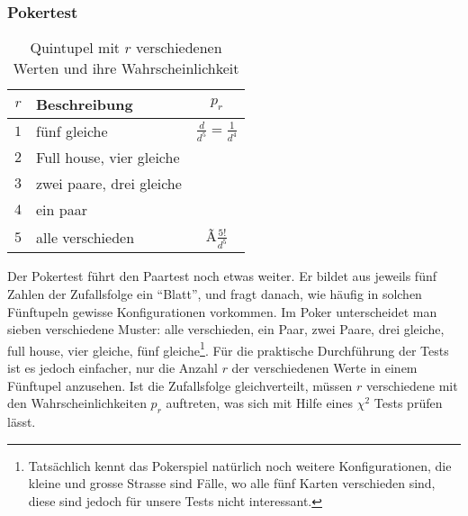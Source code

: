 \subsubsection{Pokertest}
\begin{table}
\begin{center}
\begin{tabular}{|c|l|c|}
\hline
$r$&Beschreibung&$p_r$\\
\hline
$1$&fünf gleiche&$\frac{d}{d^5}=\frac1{d^4}$\\
$2$&Full house, vier gleiche&$ $\\
$3$&zwei paare, drei gleiche&$ $\\
$4$&ein paar&$ $\\
$5$&alle verschieden&Ã$\frac{5!}{d^5}$\\
\hline
\end{tabular}
\end{center}
\caption{Quintupel mit $r$ verschiedenen Werten und ihre Wahrscheinlichkeit}
\end{table}
Der Pokertest führt den Paartest noch etwas weiter.
Er bildet aus jeweils
fünf Zahlen der Zufallsfolge ein ``Blatt'', und fragt danach, wie häufig
in solchen Fünftupeln gewisse Konfigurationen vorkommen.
Im Poker
unterscheidet man sieben verschiedene Muster: alle verschieden, ein Paar,
zwei Paare, drei gleiche, full house, vier gleiche, fünf
gleiche\footnote{Tatsächlich kennt das Pokerspiel natürlich noch weitere
Konfigurationen, die kleine und grosse Strasse sind Fälle, wo alle fünf
Karten verschieden sind, diese sind jedoch für unsere Tests nicht
interessant.}.
Für die praktische Durchführung der Tests ist es jedoch
einfacher, nur die Anzahl $r$ der verschiedenen Werte in einem Fünftupel
anzusehen.
Ist die Zufallsfolge gleichverteilt, müssen $r$ verschiedene
mit den Wahrscheinlichkeiten $p_r$ auftreten, was sich mit Hilfe eines
$\chi^2$ Tests prüfen lässt.

